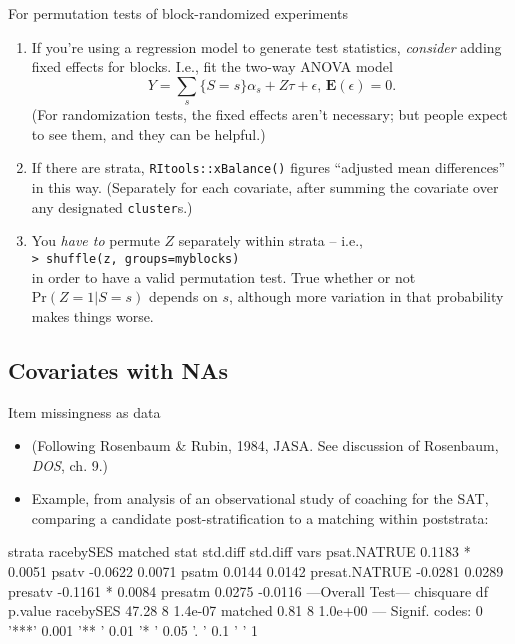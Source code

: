 \begin{frame}{For permutation tests of block-randomized experiments}
  
  \begin{enumerate}
  \item If you're using a regression model to generate test
    statistics, \textit{consider} adding fixed effects for blocks.  I.e., fit
    the two-way ANOVA model
$$
Y = \sum_{s}\{S=s\}\alpha_{s} + Z\tau + \epsilon,\, \mathbf{E}(\epsilon) = 0.
$$
 (For randomization tests, the fixed effects aren't necessary; but
 people expect to see them, and they can be helpful.)
\item If there are strata, \texttt{RItools::xBalance()} figures
  ``adjusted mean differences'' in this way.  (Separately
  for each covariate, after summing the covariate over any designated \texttt{cluster}s.)
  \item  You \textit{have to} permute $Z$ separately within strata -- i.e.,\\
\texttt{> shuffle(z, groups=myblocks)}\\
in order to have a  valid permutation test. True whether or not $\mathrm{Pr}(Z=1|S=s)$ depends on $s$, although more variation in that probability makes things worse.
  \end{enumerate}




\end{frame}

\subsection{Covariates with NAs}

\begin{frame}[fragile]{Item missingness as data}

  \begin{itemize}
  \item (Following Rosenbaum \& Rubin, 1984, JASA.
See discussion of Rosenbaum, \textit{DOS}, ch. 9.)
  \item Example, from analysis of an observational study of coaching
    for the SAT, comparing a candidate post-stratification to a
    matching within poststrata:
  \end{itemize}

\begin{semiverbatim}
              strata racebySES          matched        
              stat    std.diff         std.diff        
vars                                                   
psat.NATRUE            0.1183  *        0.0051         
psatv                  -0.0622          0.0071         
psatm                  0.0144           0.0142         
presat.NATRUE          -0.0281          0.0289         
presatv                -0.1161 *        0.0084         
presatm                0.0275           -0.0116        
---Overall Test---
          chisquare df p.value
racebySES     47.28  8 1.4e-07
matched        0.81  8 1.0e+00
---
Signif. codes:  0 '***' 0.001 '** ' 0.01 '*  ' 0.05 '.  ' 0.1 '   ' 1     
\end{semiverbatim}

  
\end{frame}

